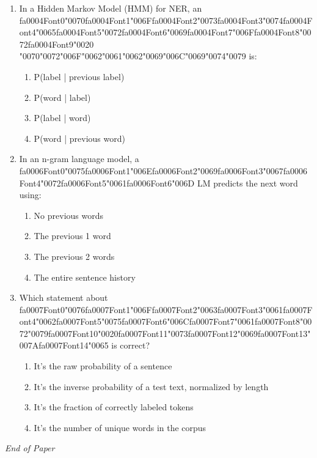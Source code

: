 \documentclass[12pt]{article}
\begin{document}
\begin{enumerate}[label=Q\arabic*.]
\item In a Hidden Markov Model (HMM) for NER, an {\csname fa0004Font0\endcsname\char"0070}{\csname fa0004Font1\endcsname\char"006F}{\csname fa0004Font2\endcsname\char"0073}{\csname fa0004Font3\endcsname\char"0074}{\csname fa0004Font4\endcsname\char"0065}{\csname fa0004Font5\endcsname\char"0072}{\csname fa0004Font6\endcsname\char"0069}{\csname fa0004Font7\endcsname\char"006F}{\csname fa0004Font8\endcsname\char"0072}{\csname fa0004Font9\endcsname\char"0020} {\char"0070}{\char"0072}{\char"006F}{\char"0062}{\char"0061}{\char"0062}{\char"0069}{\char"006C}{\char"0069}{\char"0074}{\char"0079} is:
\begin{enumerate}[label=(\Alph*)]
    \item P(label | previous label)
    \item P(word | label)
    \item P(label | word)
    \item P(word | previous word)
\end{enumerate}
\item In an n-gram language model, a {\csname fa0006Font0\endcsname\char"0075}{\csname fa0006Font1\endcsname\char"006E}{\csname fa0006Font2\endcsname\char"0069}{\csname fa0006Font3\endcsname\char"0067}{\csname fa0006Font4\endcsname\char"0072}{\csname fa0006Font5\endcsname\char"0061}{\csname fa0006Font6\endcsname\char"006D} LM predicts the next word using:
\begin{enumerate}[label=(\Alph*)]
    \item No previous words
    \item The previous 1 word
    \item The previous 2 words
    \item The entire sentence history
\end{enumerate}
\item Which statement about {\csname fa0007Font0\endcsname\char"0076}{\csname fa0007Font1\endcsname\char"006F}{\csname fa0007Font2\endcsname\char"0063}{\csname fa0007Font3\endcsname\char"0061}{\csname fa0007Font4\endcsname\char"0062}{\csname fa0007Font5\endcsname\char"0075}{\csname fa0007Font6\endcsname\char"006C}{\csname fa0007Font7\endcsname\char"0061}{\csname fa0007Font8\endcsname\char"0072}{\char"0079}{\csname fa0007Font10\endcsname\char"0020}{\csname fa0007Font11\endcsname\char"0073}{\csname fa0007Font12\endcsname\char"0069}{\csname fa0007Font13\endcsname\char"007A}{\csname fa0007Font14\endcsname\char"0065} is correct?
\begin{enumerate}[label=(\Alph*)]
    \item It's the raw probability of a sentence
    \item It's the inverse probability of a test text, normalized by length
    \item It's the fraction of correctly labeled tokens
    \item It's the number of unique words in the corpus
\end{enumerate}
\end{enumerate}

\vfill
\noindent\textit{End of Paper}
\end{document}
